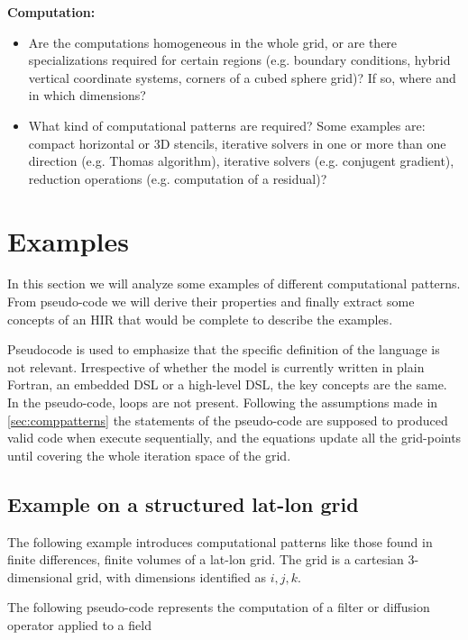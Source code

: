 \documentclass[a4paper,10pt]{scrartcl}
\begin{document}
\textbf{Computation:}\newline
\begin{itemize}
  \item Are the computations homogeneous in the whole grid, or are there specializations required for certain regions (e.g. boundary conditions, hybrid vertical coordinate systems, corners of a cubed sphere grid)? If so, where and in which dimensions?
  \item What kind of computational patterns are required? Some examples are: compact horizontal or 3D stencils, iterative solvers in one or more than one direction (e.g. Thomas algorithm), iterative solvers (e.g. conjugent gradient), reduction operations (e.g. computation of a residual)?
\end{itemize}

\section{Examples}

In this section we will analyze some examples of different computational patterns. From pseudo-code we will derive their properties and finally extract some concepts of an HIR that would be complete to describe the examples.
 
Pseudocode is used to emphasize that the specific definition of the language is not relevant.
Irrespective of whether the model is currently written in plain Fortran, an embedded DSL or a high-level DSL, the key concepts are the same.
In the pseudo-code, loops are not present. Following the assumptions made in \cref{sec:comppatterns} the statements of the pseudo-code are supposed to produced valid code when execute sequentially, and the equations update all the grid-points until covering the whole iteration space of the grid. 

\subsection{Example on a structured lat-lon grid}

The following example introduces computational patterns like those found in finite differences, finite volumes of a lat-lon grid. The grid is a cartesian 3-dimensional grid, with dimensions identified as $i,j,k$.

The following pseudo-code represents the computation of a filter or diffusion operator applied to a field
\end{document}
